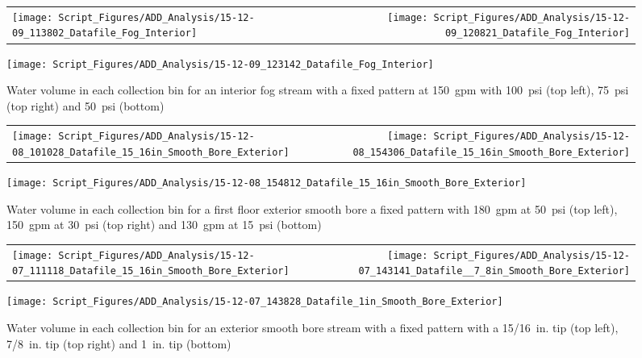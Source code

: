 \documentclass{article}
\begin{document}
\begin{figure}[ht]
\begin{tabular*}{\textwidth}{lr}
\texttt{[image: Script\_Figures/ADD\_Analysis/15-12-09\_113802\_Datafile\_Fog\_Interior]} &
\texttt{[image: Script\_Figures/ADD\_Analysis/15-12-09\_120821\_Datafile\_Fog\_Interior]} \\
\end{tabular*}
\centering
\texttt{[image: Script\_Figures/ADD\_Analysis/15-12-09\_123142\_Datafile\_Fog\_Interior]}
\caption{Water volume in each collection bin for an interior fog stream with a fixed pattern at 150~gpm with 100~psi (top left), 75~psi (top right) and 50~psi (bottom)}
\label{fig:Interior_Varying_Nozzle_Pressure_Fog_Fixed_Pattern}
\end{figure}

\begin{figure}[ht]
\begin{tabular*}{\textwidth}{lr}
\texttt{[image: Script\_Figures/ADD\_Analysis/15-12-08\_101028\_Datafile\_15\_16in\_Smooth\_Bore\_Exterior]} &
\texttt{[image: Script\_Figures/ADD\_Analysis/15-12-08\_154306\_Datafile\_15\_16in\_Smooth\_Bore\_Exterior]} \\
\end{tabular*}
\centering
\texttt{[image: Script\_Figures/ADD\_Analysis/15-12-08\_154812\_Datafile\_15\_16in\_Smooth\_Bore\_Exterior]}
\caption{Water volume in each collection bin for a first floor exterior smooth bore a fixed pattern with 180~gpm at 50~psi (top left), 150~gpm at 30~psi (top right) and 130~gpm at 15~psi (bottom)}
\label{fig:Exterior_First_Floor_Varying_Nozzle_Pressure_SB_Fixed_Pattern}
\end{figure}

\clearpage

\begin{figure}[ht]
\begin{tabular*}{\textwidth}{lr}
\texttt{[image: Script\_Figures/ADD\_Analysis/15-12-07\_111118\_Datafile\_15\_16in\_Smooth\_Bore\_Exterior]} &
\texttt{[image: Script\_Figures/ADD\_Analysis/15-12-07\_143141\_Datafile\_\_7\_8in\_Smooth\_Bore\_Exterior]} \\
\end{tabular*}
\centering
\texttt{[image: Script\_Figures/ADD\_Analysis/15-12-07\_143828\_Datafile\_1in\_Smooth\_Bore\_Exterior]}
\caption{Water volume in each collection bin for an exterior smooth bore stream with a fixed pattern with a 15/16~in. tip (top left), 7/8~in. tip (top right) and 1~in. tip (bottom)}
\label{fig:Exterior_Second_Floor_Varying_Flow_Rates_SB_Fixed_Pattern}
\end{figure}
\end{document}
